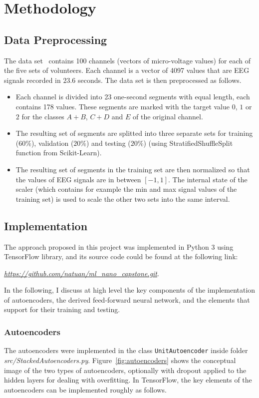 \documentclass[12pt]{article}
\begin{document}
\section{Methodology}
\subsection{Data Preprocessing}

The data set~\cite{andrzejak2001indications} contains 100 channels (vectors of micro-voltage values) for each of the five sets of volunteers. Each channel is a vector of 4097 values that are EEG signals recorded in $23.6$ seconds. The data set is then preprocessed as follows.
\begin{itemize}
\item Each channel is divided into 23 one-second segments with equal length, each contains 178 values. These segments are marked with the target value $0$, $1$ or $2$ for the classes $A + B$, $C + D$ and $E$ of the original channel.
\item The resulting set of segments are splitted into three separate sets for training ($60\%$), validation ($20\%$) and testing ($20\%$) (using StratifiedShuffleSplit function from Scikit-Learn).
\item The resulting set of segments in the training set are then normalized so that the values of EEG signals are in between $[-1,1]$. The internal state of the scaler (which contains for example the min and max signal values of the training set) is used to scale the other two sets into the same interval.
\end{itemize}

\subsection{Implementation}

\noindent
The approach proposed in this project was implemented in Python 3 using TensorFlow library, and its source code could be found at the following link:
\begin{center}
\href{https://github.com/natuan/ml\_nano\_capstone.git}{\textit{https://github.com/natuan/ml\_nano\_capstone.git}}.
\end{center}

In the following, I discuss at high level the key components of the implementation of autoencoders, the derived feed-forward neural network, and the elements that support for their training and testing.

\subsubsection{Autoencoders}
\noindent
The autoencoders were implemented in the class \texttt{UnitAutoencoder} inside folder \textit{src/StackedAutoencoders.py}. Figure~\ref{fig:autoencoders} shows the conceptual image of the two types of autoencoders, optionally with dropout applied to the hidden layers for dealing with overfitting. In TensorFlow, the key elements of the autoencoders can be implemented roughly as follows.
\end{document}
